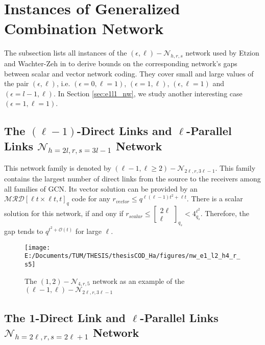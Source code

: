 \section{Instances of Generalized Combination Network}

The subsection lists all instances of the $(\epsilon,\ell)-\mathcal{N}_{h,r,s}$
network used by Etzion and Wachter-Zeh in \cite{Wachter-Zeh:2018}
to derive bounds on the corresponding network's gaps between scalar
and vector network coding. They cover small and large values of the
pair $(\epsilon,\ell)$, i.e. $(\epsilon=0,\ell=1)$, $(\epsilon=1,\ell)$,
$(\epsilon,\ell=1)$ and $(\epsilon=l-1,\ell)$. In Section \ref{sec:e1l1_nw},
we study another interesting case $(\epsilon=1,\ell=1)$.

\subsection{The $(\ell-1)$-Direct Links and $\ell$-Parallel Links $\mathcal{N}_{h=2l,r,s=3l-1}$
Network}

This network family is denoted by $\left(\ell-1,\ell\geq2\right)-\mathcal{N}_{2\ell,r,3\ell-1}$.
This family contains the largest number of direct links from the source
to the receivers among all families of GCN. Its vector solution can
be provided by an $\mathcal{MRD}\left[\ell t\times\ell t,t\right]_{q}$
code for any $r_{vector}\leq q^{\ell\left(\ell-1\right)t^{2}+\ell t}$.
There is a scalar solution for this network, if and ony if $r_{scalar}\leq\left[\begin{array}{c}
2\ell\\
\ell
\end{array}\right]_{q_{s}}<4_{q_{s}}^{\ell^{2}}$. Therefore, the gap tends to $q^{t^{2}+\mathcal{O}\left(t\right)}$
for large $\ell$.
\begin{figure}[H]
\caption{The $\left(1,2\right)-\mathcal{N}_{4,r,5}$ network as an example
of the $\left(\ell-1,\ell\right)-\mathcal{N}_{2\ell,r,3\ell-1}$ \label{fig:network_l1e2h4rs5}}

\centering{}\texttt{[image: E:/Documents/TUM/THESIS/thesisCOD\_Ha/figures/nw\_e1\_l2\_h4\_r\_s5]}
\end{figure}


\subsection{The 1-Direct Link and $\ell$-Parallel Links $\mathcal{N}_{h=2\ell,r,s=2\ell+1}$
Network}

